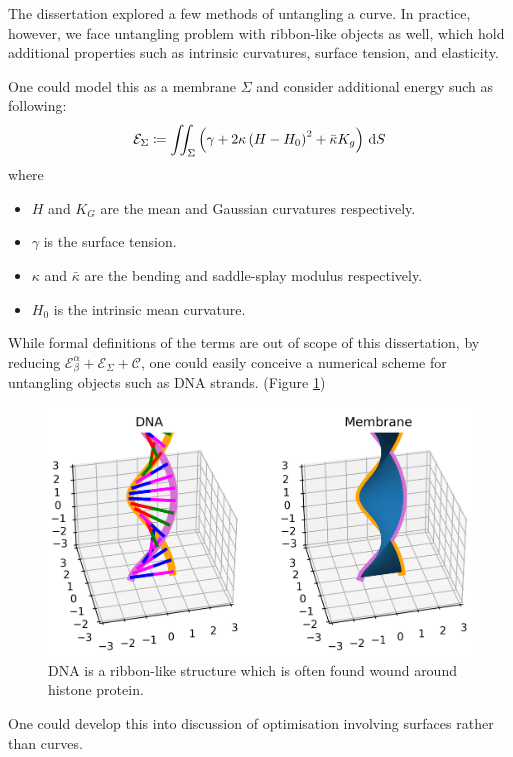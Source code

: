 \documentclass[../dissertation.tex]{subfiles}
\begin{document}
The dissertation explored a few methods of untangling a curve.
In practice, however, we face untangling problem with ribbon-like objects as well,
which hold additional properties such as intrinsic curvatures, surface tension, and elasticity.

One could model this as a membrane $\Sigma$ and consider additional energy such as following\cite{mmb}:
\begin{equation}
    \mathcal{E}_{\Sigma} \coloneqq \iint_{\Sigma} \left( \gamma + 2 \kappa \left( H-H_0 \right)^2 + \bar \kappa K_g \right) \, \text{d} S
\end{equation}
where
\begin{itemize}
    \item $H$ and $K_G$ are the mean and Gaussian curvatures respectively.
    \item $\gamma$ is the surface tension.
    \item $\kappa$ and $\bar \kappa$ are the bending and saddle-splay modulus respectively.
    \item $H_0$ is the intrinsic mean curvature.
\end{itemize}
While formal definitions of the terms are out of scope of this dissertation,
by reducing $\mathcal{E}_{\beta}^{\alpha} + \mathcal{E}_{\Sigma} + \mathcal{C}$,
one could easily conceive a numerical scheme for untangling objects such as DNA strands. (Figure \ref{fig: DNA})

\begin{figure}[tbp]
    \centering
    \includegraphics[scale=0.7]{sections/MembraneImgs/dnaMembrane}
    \caption{DNA is a ribbon-like structure which is often found wound around histone protein.\cite{gilchrist_2023}}
    \label{fig: DNA}
\end{figure}

One could develop this into discussion of optimisation involving surfaces rather than curves.
\end{document}
